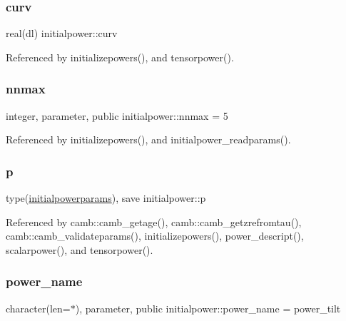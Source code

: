 \subsubsection{\texorpdfstring{curv}{curv}}
{\footnotesize\ttfamily real(dl) initialpower\+::curv\hspace{0.3cm}{\ttfamily [private]}}



Referenced by initializepowers(), and tensorpower().

\mbox{\label{namespaceinitialpower_a9749c023ff83f7ffa2677dc578379c10}} 
\subsubsection{\texorpdfstring{nnmax}{nnmax}}
{\footnotesize\ttfamily integer, parameter, public initialpower\+::nnmax = 5}



Referenced by initializepowers(), and initialpower\+\_\+readparams().

\mbox{\label{namespaceinitialpower_ace8ec05c677782ea3843bc3e85b6f42d}} 
\subsubsection{\texorpdfstring{p}{p}}
{\footnotesize\ttfamily type(\mbox{\hyperlink{structinitialpower_1_1initialpowerparams}{initialpowerparams}}), save initialpower\+::p\hspace{0.3cm}{\ttfamily [private]}}



Referenced by camb\+::camb\+\_\+getage(), camb\+::camb\+\_\+getzrefromtau(), camb\+::camb\+\_\+validateparams(), initializepowers(), power\+\_\+descript(), scalarpower(), and tensorpower().

\mbox{\label{namespaceinitialpower_a5397e53840b8c5aa10ab09fcd8cb23b4}} 
\subsubsection{\texorpdfstring{power\+\_\+name}{power\_name}}
{\footnotesize\ttfamily character(len=$\ast$), parameter, public initialpower\+::power\+\_\+name = \textquotesingle{}power\+\_\+tilt\textquotesingle{}}


